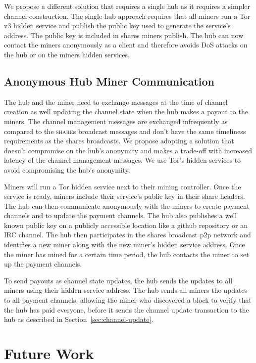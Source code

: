 \documentclass{article}
\begin{document}
We propose a different solution that requires a single hub as it
requires a simpler channel construction. The single hub approach
requires that all miners run a Tor v3 hidden service and publish the
public key used to generate the service's address. The public key is
included in shares miners publish. The hub can now contact the miners
anonymously as a client and therefore avoids DoS attacks on the hub or
on the miners hidden services.

\subsection{Anonymous Hub Miner
  Communication}\label{sec:hub-miner-communication}

The hub and the miner need to exchange messages at the time of channel
creation as well updating the channel state when the hub makes a
payout to the miners. The channel management messages are exchanged
infrequently as compared to the \textsc{share}s broadcast messages and
don't have the same timeliness requirements as the shares
broadcasts. We propose adopting a solution that doesn't compromise on
the hub's anonymity and makes a trade-off with increased latency of
the channel management messages. We use Tor's hidden services to avoid
compromising the hub's anonymity.

Miners will run a Tor hidden service next to their mining
controller. Once the service is ready, miners include their service's
public key in their share headers. The hub can then communicate
anonymously with the miners to create payment channels and to update
the payment channels. The hub also publishes a well known public key
on a publicly accessible location like a github repository or an IRC
channel. The hub then participates in the shares broadcast p2p network
and identifies a new miner along with the new miner's hidden service
address. Once the miner has mined for a certain time period, the hub
contacts the miner to set up the payment channels.

To send payouts as channel state updates, the hub sends the updates to
all miners using their hidden service address. The hub sends all
miners the updates to all payment channels, allowing the miner who
discovered a block to verify that the hub has paid everyone, before it
sends the channel update transaction to the hub as described in
Section~\ref{sec:channel-update}.

\section{Future Work}
\end{document}

